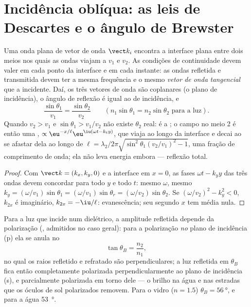 \section{Incidência oblíqua: as leis de Descartes e o ângulo de Brewster}

\begin{theorem}\label{thm:b2:wave-interfaces:snell}
Uma onda plana de vetor de onda $\vect k_i$ encontra a interface plana entre
dois meios nos quais as ondas viajam a $v_1$ e $v_2$. As condições de
continuidade devem valer em cada ponto da interface e em cada instante:
as ondas refletida e transmitida devem ter a mesma frequência e
o mesmo \emph{vetor de onda tangencial} que a incidente. Daí, os
três vetores de onda são coplanares (o plano de incidência), o ângulo de
reflexão é igual ao de incidência, e
\[
\frac{\sin\theta_1}{v_1} = \frac{\sin\theta_2}{v_2} \qquad (n_1\sin\theta_1 = n_2\sin\theta_2 \text{ para a luz}) .
\]
Quando $v_2 > v_1$ e $\sin\theta_1 > v_1/v_2$ não existe $\theta_2$ real:
é a \emph{}; o campo no meio 2 é então uma
\emph{}, $\propto\eu^{-x/\ell}\eu^{\iu(\omega t - k_ty)}$, que viaja
ao longo da interface e decai ao se afastar dela ao longo de $\ell = \lambda_2/2\pi
\sqrt{\sin^2\theta_1(v_2/v_1)^2 - 1}$, uma fração de comprimento de onda; ela
não leva energia embora --- reflexão total.
\end{theorem}

\begin{proof}
Com $\vect k = (k_x, k_y, 0)$ e a interface em $x = 0$, as fases
$\omega t - k_yy$ das três ondas devem concordar para todo $y$ e todo $t$: mesmo
$\omega$, mesmo $k_y = (\omega/v_1)\sin\theta_1 = (\omega/v_1)\sin\theta_r = (\omega/v_2)\sin
\theta_2$. Se $(\omega/v_2)^2 - k_y^2 < 0$, $k_{2x}$ é imaginário, $k_{2x} = -\iu/\ell$:
evanescência; seu  segundo $x$ tem média nula.
\end{proof}

\begin{proposition}\label{prop:b2:wave-interfaces:brewster}
Para a luz que incide num dielétrico, a amplitude refletida depende da
polarização (, admitidos no caso geral): para a
polarização \emph{no} plano de incidência (p) ela se anula no
\emph{}
\[
\tan\theta_B = \frac{n_2}{n_1} ,
\]
no qual os raios refletido e refratado são perpendiculares; a luz
refletida em $\theta_B$ fica então completamente polarizada perpendicularmente ao
plano de incidência (s), e parcialmente polarizada em torno dele --- o brilho na
água e nas estradas que os óculos de sol polarizados removem. Para o vidro ($n = 1.5$)
$\theta_B = \qty{56}{\degree}$, e para a água \qty{53}{\degree}.
\end{proposition}

